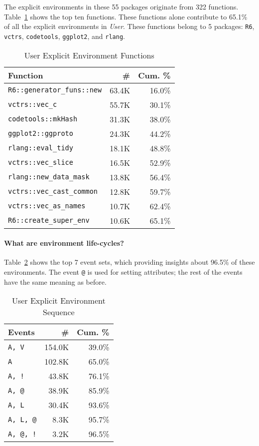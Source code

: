 \documentclass[10pt,review,sigplan,anonymous=true,authorversion=true,nonacm=true]{acmart}
\newcommand{\code}[1]{\lstinline |#1|\xspace}
\begin{document}
The explicit environments in these 55 packages originate from 322 functions.
Table~\ref{table:user_explicit_fun} shows the top ten functions. These functions
alone contribute to 65.1\% of all the explicit environments in \emph{User}.
These functions belong to 5 packages: \code{R6}, \code{vctrs}, \code{codetools},
\code{ggplot2}, and \code{rlang}.

\begin{table}[!h]
  \vspace{-3mm}
  \small
  \caption{User Explicit Environment Functions} \label{table:user_explicit_fun}
  \centering
  \begin{tabular}{lrr}
    \toprule
    \textbf{Function}&\textbf{\#}&\textbf{Cum. \%}\\
    \midrule
    \code{R6::generator_funs::new}&63.4K&16.0\%\\
    \code{vctrs::vec_c}&55.7K&30.1\%\\
    \code{codetools::mkHash}&31.3K&38.0\%\\
    \code{ggplot2::ggproto}&24.3K&44.2\%\\
    \code{rlang::eval_tidy}&18.1K&48.8\%\\
    \code{vctrs::vec_slice}&16.5K&52.9\%\\
    \code{rlang::new_data_mask}&13.8K&56.4\%\\
    \code{vctrs::vec_cast_common}&12.8K&59.7\%\\
    \code{vctrs::vec_as_names}&10.7K&62.4\%\\
    \code{R6::create_super_env}&10.6K&65.1\%\\
    \bottomrule
  \end{tabular}
\end{table}

\paragraph{What are environment life-cycles?}
Table~\ref{table:user_explicit_env_seq} shows the top 7 event sets, which
providing insights about 96.5\% of these environments. The event \texttt{@} is
used for setting attributes; the rest of the events have the same meaning as
before.

\begin{table}[!h]
  \vspace{-3mm}
  \small
  \caption{User Explicit Environment Sequence} \label{table:user_explicit_env_seq}
  \centering
  \begin{tabular}{lrr}
    \toprule
    \textbf{Events}&\textbf{\#}&\textbf{Cum. \%}\\
    \midrule
    \texttt{A, V}&154.0K&39.0\%\\
    \texttt{A}&102.8K&65.0\%\\
    \texttt{A, !}&43.8K&76.1\%\\
    \texttt{A, @}&38.9K&85.9\%\\
    \texttt{A, L}&30.4K&93.6\%\\
    \texttt{A, L, @}&8.3K&95.7\%\\
    \texttt{A, @, !}&3.2K&96.5\%\\
    \bottomrule
  \end{tabular}
\end{table}
\end{document}
